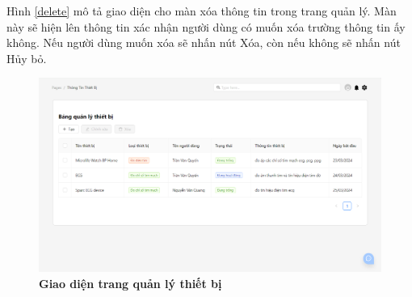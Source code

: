 Hình \ref{delete} mô tả giao diện cho màn xóa thông tin trong trang quản lý. Màn này sẽ hiện lên thông tin xác nhận người dùng có muốn 
xóa trường thông tin ấy không. Nếu người dùng muốn xóa sẽ nhấn nút Xóa, còn nếu không sẽ nhấn nút Hủy bỏ.

\begin{figure}[H]
  \centering
  \includegraphics[scale=0.5]{Images/server/webUI/deviceTable.png}
  \caption[Giao diện trang quản lý thiết bị]{\bfseries \fontsize{12pt}{0pt}\selectfont Giao diện trang quản lý thiết bị}
  \label{deviceTable} %
\end{figure}

